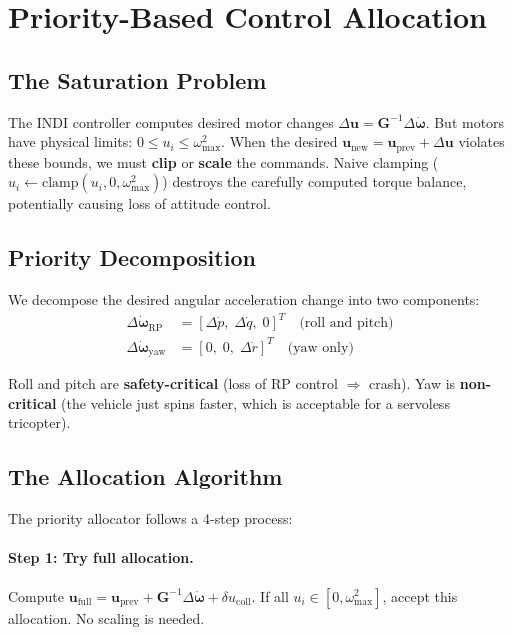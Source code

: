 \documentclass[12pt, a4paper]{article}
\newcommand{\bu}{\bm{u}}
\newcommand{\bomega}{\bm{\omega}}
\begin{document}
\section{Priority-Based Control Allocation}
\label{sec:priority_alloc}

\subsection{The Saturation Problem}

The INDI controller computes desired motor changes $\Delta\bu = \bm{G}^{-1} \Delta\dot{\bomega}$.  But motors have physical limits: $0 \leq u_i \leq \omega_{\max}^2$.  When the desired $\bu_{\text{new}} = \bu_{\text{prev}} + \Delta\bu$ violates these bounds, we must \textbf{clip} or \textbf{scale} the commands.  Naive clamping ($u_i \leftarrow \text{clamp}(u_i, 0, \omega_{\max}^2)$) destroys the carefully computed torque balance, potentially causing loss of attitude control.

\subsection{Priority Decomposition}

We decompose the desired angular acceleration change into two components:
\begin{align}
    \Delta\dot{\bomega}_{\text{RP}} &= [\Delta\dot{p}, \; \Delta\dot{q}, \; 0]^T \quad \text{(roll and pitch)} \\
    \Delta\dot{\bomega}_{\text{yaw}} &= [0, \; 0, \; \Delta\dot{r}]^T \quad \text{(yaw only)}
\end{align}

Roll and pitch are \textbf{safety-critical} (loss of RP control $\Rightarrow$ crash).  Yaw is \textbf{non-critical} (the vehicle just spins faster, which is acceptable for a servoless tricopter).

\subsection{The Allocation Algorithm}

The priority allocator follows a 4-step process:

\paragraph{Step 1: Try full allocation.}  Compute $\bu_{\text{full}} = \bu_{\text{prev}} + \bm{G}^{-1} \Delta\dot{\bomega} + \delta u_{\text{coll}}$.  If all $u_i \in [0, \omega_{\max}^2]$, accept this allocation.  No scaling is needed.
\end{document}
